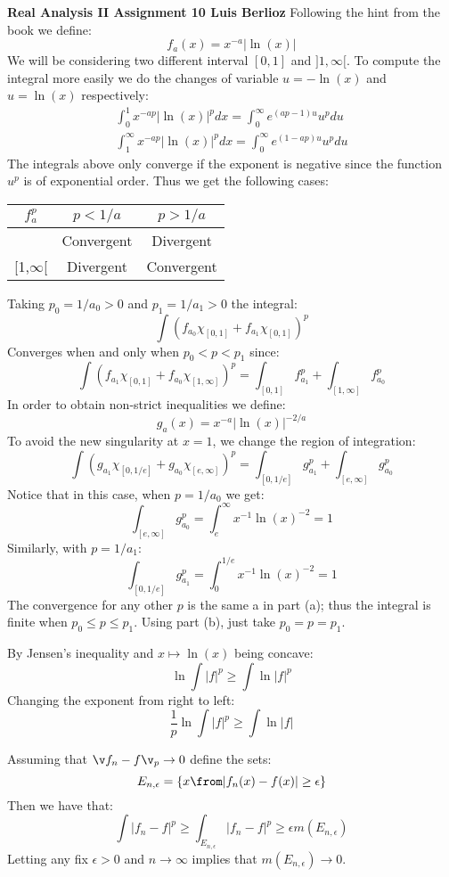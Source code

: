 \noindent\textbf{Real Analysis II Assignment 10 \hspace{\fill} Luis Berlioz}
Following the hint from the book we define:
$$f_a(x)= x^{-a}|\ln(x)|$$
We will be considering two different interval $[0,1]$ and $]1,\infty[$. To compute the integral more easily we do the  changes of variable $u=-\ln(x)$ and $u=\ln(x)$ respectively:
\begin{gather*}
\int_0^1 x^{-ap}|\ln(x)|^pdx = \int_0^\infty e^{(ap-1)u}u^{p}du\\
\int_1^\infty x^{-ap}|\ln(x)|^pdx = \int_0^\infty e^{(1-ap)u}u^{p}du
\end{gather*}
The integrals above only converge if the exponent is negative since the function $u^p$ is of exponential order. Thus we get the following cases:
\begin{center}
\begin{tabular}{|c|c|c|}
\hline
$f_a^p$ & $p<1/a$ & $p>1/a$ \\
\hline
[0,1] & Convergent & Divergent \\
\hline
[1,$\infty$[ & Divergent & Convergent\\
\hline
\end{tabular}
\end{center}
Taking $p_0= 1/a_0>0$ and $p_1=1/a_1>0$ the integral:
$$\int \left( f_{a_0}\chi_{[0,1]}+f_{a_1}\chi_{[0,1]}\right)^p $$
Converges when and only when $p_0<p<p_1$ since:
$$\int \left( f_{a_1}\chi_{[0,1]}+f_{a_0}\chi_{[1,\infty]}\right)^p=  \int_{[0,1]} f_{a_1}^p + \int_{[1,\infty]} f_{a_0}^p$$ 
In order to obtain non-strict inequalities we define:
$$g_a(x)= x^{-a}|\ln(x)|^{-2/a}$$
To avoid the new singularity at $x=1$, we change the region of integration:
$$\int \left( g_{a_1}\chi_{[0,1/e]}+g_{a_0}\chi_{[e,\infty]}\right)^p=  \int_{[0,1/e]} g_{a_1}^p + \int_{[e,\infty]} g_{a_0}^p$$ 
Notice that in this case, when $p=1/a_0$ we get:
$$\int_{[e,\infty]} g_{a_0}^p=\int_e^\infty x^{-1}\ln(x)^{-2}= 1$$
Similarly, with $p=1/a_1$:
$$\int_{[0,1/e]} g_{a_1}^p=\int_0^{1/e} x^{-1}\ln(x)^{-2}= 1$$
The convergence for any other $p$ is the same a in part (a); thus the integral is finite when $p_0\leq p \leq p_1$.
Using part (b), just take $p_0= p = p_1$.

By Jensen's inequality and $x\mapsto \ln(x)$ being concave:
$$\ln\int |f|^p \geq \int \ln|f|^p$$
Changing the exponent from right to left:
$$\frac 1p\ln\int |f|^p \geq \int \ln|f|$$


\newpage
{}
Assuming that $\v f_n-f\v_p \to 0$ define the sets:
$$E_{n,\epsilon} = \{ x\from |f_n(x) -f(x)| \geq \epsilon \}$$
Then we have that:
$$\int |f_n-f|^p \geq \int_{E_{n,\epsilon}}|f_n-f|^p\geq \epsilon m(E_{n,\epsilon})$$
Letting any fix $\epsilon>0$ and $n\to \infty$ implies that $m(E_{n,\epsilon})\to 0$.

